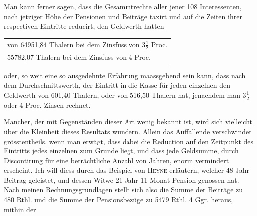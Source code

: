 Man kann ferner sagen, dass die Gesammtrechte aller jener 108 Interessenten, nach jetziger Höhe der Pensionen und Beiträge taxirt und auf die Zeiten ihrer respectiven Eintritte reducirt, den Geldwerth hatten
\begin{center}
\begin{tabular}{l}
von 64951,84 Thalern bei dem Zinsfuss von \(3\tfrac{1}{2}\) Proc.\\
\phantom{von }55782,07 Thalern bei dem Zinsfuss von 4 Proc.
\end{tabular}
\end{center}
\noindent oder, so weit eine so ausgedehnte Erfahrung maassgebend sein kann, dass nach dem Durchschnittswerth, der Eintritt in die Kasse für jeden einzelnen den Geldwerth von 601,40 Thalern, oder von 516,50 Thalern hat, jenachdem man \(3\tfrac{1}{2}\) oder 4 Proc. Zinsen rechnet.

Mancher, der mit Gegenständen dieser Art wenig bekannt ist, wird sich vielleicht über die Kleinheit dieses Resultats wundern. Allein das Auffallende verschwindet grösstentheils, wenn man erwägt, dass dabei die Reduction auf den Zeitpunkt des Eintritts jedes einzelnen zum Grunde liegt, und dass jede Geldsumme, durch Discontirung für eine beträchtliche Anzahl von Jahren, enorm vermindert erscheint. Ich will diess durch das Beispiel von \textsc{Heyne} erläutern, welcher 48 Jahr Beitrag geleistet, und dessen Witwe 21 Jahr 11 Monat Pension genossen hat. Nach meinen Rechnungsgrundlagen stellt sich also die Summe der Beiträge zu 480 Rthl. und die Summe der Pensionsbezüge zu 5479 Rthl. 4 Ggr. heraus, mithin der
